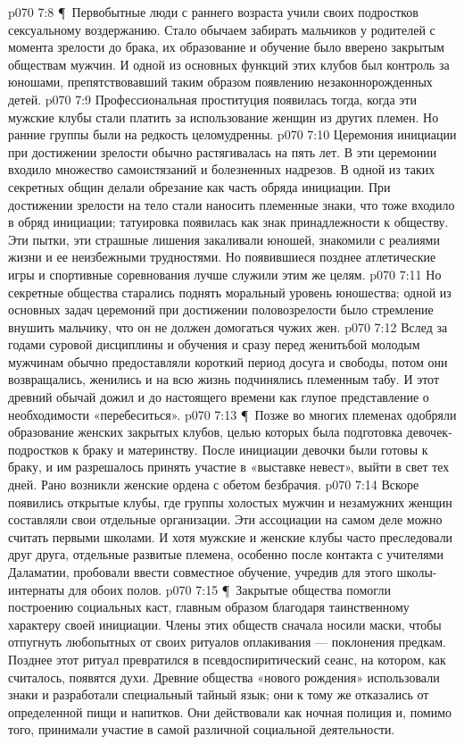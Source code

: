\vs p070 7:8 \P\ Первобытные люди с раннего возраста учили своих подростков сексуальному воздержанию. Стало обычаем забирать мальчиков у родителей с момента зрелости до брака, их образование и обучение было вверено закрытым обществам мужчин. И одной из основных функций этих клубов был контроль за юношами, препятствовавший таким образом появлению незаконнорожденных детей.
\vs p070 7:9 Профессиональная проституция появилась тогда, когда эти мужские клубы стали платить за использование женщин из других племен. Но ранние группы были на редкость целомудренны.
\vs p070 7:10 Церемония инициации при достижении зрелости обычно растягивалась на пять лет. В эти церемонии входило множество самоистязаний и болезненных надрезов. В одной из таких секретных общин делали обрезание как часть обряда инициации. При достижении зрелости на тело стали наносить племенные знаки, что тоже входило в обряд инициации; татуировка появилась как знак принадлежности к обществу. Эти пытки, эти страшные лишения закаливали юношей, знакомили с реалиями жизни и ее неизбежными трудностями. Но появившиеся позднее атлетические игры и спортивные соревнования лучше служили этим же целям.
\vs p070 7:11 Но секретные общества старались поднять моральный уровень юношества; одной из основных задач церемоний при достижении половозрелости было стремление внушить мальчику, что он не должен домогаться чужих жен.
\vs p070 7:12 Вслед за годами суровой дисциплины и обучения и сразу перед женитьбой молодым мужчинам обычно предоставляли короткий период досуга и свободы, потом они возвращались, женились и на всю жизнь подчинялись племенным табу. И этот древний обычай дожил и до настоящего времени как глупое представление о необходимости «перебеситься».
\vs p070 7:13 \P\ Позже во многих племенах одобряли образование женских закрытых клубов, целью которых была подготовка девочек\hyp{}подростков к браку и материнству. После инициации девочки были готовы к браку, и им разрешалось принять участие в «выставке невест», выйти в свет тех дней. Рано возникли женские ордена с обетом безбрачия.
\vs p070 7:14 Вскоре появились открытые клубы, где группы холостых мужчин и незамужних женщин составляли свои отдельные организации. Эти ассоциации на самом деле можно считать первыми школами. И хотя мужские и женские клубы часто преследовали друг друга, отдельные развитые племена, особенно после контакта с учителями Даламатии, пробовали ввести совместное обучение, учредив для этого школы\hyp{}интернаты для обоих полов.
\vs p070 7:15 \P\ Закрытые общества помогли построению социальных каст, главным образом благодаря таинственному характеру своей инициации. Члены этих обществ сначала носили маски, чтобы отпугнуть любопытных от своих ритуалов оплакивания --- поклонения предкам. Позднее этот ритуал превратился в псевдоспиритический сеанс, на котором, как считалось, появятся духи. Древние общества «нового рождения» использовали знаки и разработали специальный тайный язык; они к тому же отказались от определенной пищи и напитков. Они действовали как ночная полиция и, помимо того, принимали участие в самой различной социальной деятельности.
